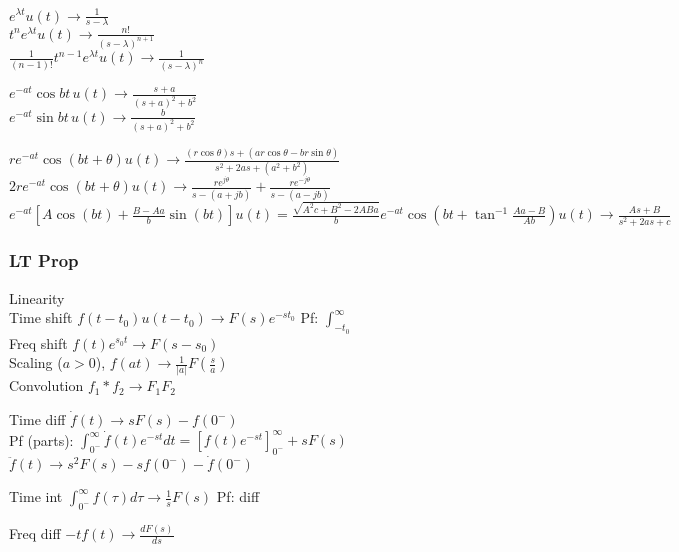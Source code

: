 \documentclass[4pt]{article}
\theoremstyle{definition}
\theoremstyle{definition}
\newcommand{\ulint}{\int_{0^-}^{\infty}}    %
\newcommand{\ra}{\rightarrow}
\begin{document}
    \(e^{\lambda t} u(t) \ra \frac{1}{s-\lambda}\)\\        %
    \(t^n e^{\lambda t} u(t) \ra \frac{n!}{(s-\lambda)^{n+1}}\)\\     %
    \(\frac{1}{(n-1)!} t^{n-1} e^{\lambda t} u(t) \ra \frac{1}{(s-\lambda)^n} \)        %

    \(e^{-at} \cos bt\, u(t) \ra \frac{s+a}{(s+a)^2 + b^2}\)\\
    \(e^{-at} \sin bt\, u(t) \ra \frac{b}{(s+a)^2 + b^2}\)    

    \(re^{-at} \cos(bt + \theta) u(t) \ra \frac{(r\cos\theta)s + (ar \cos\theta - br\sin \theta)}{s^2 + 2as + (a^2 + b^2)}\)\\
    \(2re^{-at} \cos(bt + \theta) u(t) \ra \frac{re^{j\theta}}{s-(a+jb)}+\frac{re^{-j\theta}}{s-(a-jb)}\)\\
    \(e^{-at}\left[A\cos(b t) + \frac{B-Aa}{b}\sin(bt)\right] u(t) = \frac{\sqrt{A^2c + B^2 - 2ABa}}{b}e^{-at}\cos\left(bt + \tan^{-1}\frac{Aa-B}{Ab}\right) u(t) \ra \frac{As+B}{s^2+2as+c}\)
\subsubsection{LT Prop}
    Linearity\\
    Time shift \(f(t-t_0) u(t-t_0) \ra F(s) e^{-st_0}\) Pf: \(\int_{-t_0}^{\infty}\)\\ %
    Freq shift \(f(t) e^{s_0 t} \ra F(s-s_0)\)\\
    Scaling ($a > 0$), \(f(at) \ra \frac{1}{|a|} F(\frac{s}{a})\)\\   %
    Convolution \(f_1 * f_2 \ra F_1 F_2\)

    Time diff \(\dot{f}(t) \ra sF(s) - f(0^-)\)\\     %
        Pf (parts): \(\ulint \dot{f}(t) e^{-st} dt = \left[f(t) e^{-st} \right]^{\infty}_{0^-} + s F(s)\)\\    %
    \(\ddot{f}(t) \ra s^2 F(s) - sf(0^-) - \dot{f}(0^-)\)   %

    Time int \(\ulint f(\tau) d\tau \ra \frac{1}{s} F(s)\) Pf: diff     %

    Freq diff \(-t f(t) \ra \frac{dF(s)}{ds}\)          %
\end{document}
